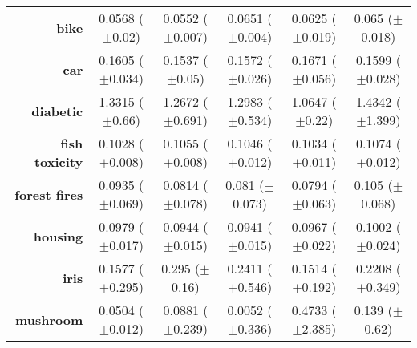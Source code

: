 \begin{table}[htb]
{\begin{tabular}{r|ccccc}
			\textbf{bike}                & \cellcolor[rgb]{ .522,  .78,  .486}0.0568 ($\pm$0.02)   & \cellcolor[rgb]{ .388,  .745,  .482}0.0552 ($\pm$0.007) & \cellcolor[rgb]{ .973,  .412,  .42}0.0651 ($\pm$0.004)  & \cellcolor[rgb]{ 1,  .922,  .518}0.0625 ($\pm$0.019)    & \cellcolor[rgb]{ .976,  .443,  .427}0.065 ($\pm$0.018)  \\
			\textbf{car}                 & \cellcolor[rgb]{ 1,  .878,  .51}0.1605 ($\pm$0.034)     & \cellcolor[rgb]{ .388,  .745,  .482}0.1537 ($\pm$0.05)  & \cellcolor[rgb]{ .733,  .843,  .502}0.1572 ($\pm$0.026) & \cellcolor[rgb]{ .973,  .412,  .42}0.1671 ($\pm$0.056)  & \cellcolor[rgb]{ 1,  .922,  .518}0.1599 ($\pm$0.028)    \\
			\textbf{diabetic}            & \cellcolor[rgb]{ .996,  .8,  .494}1.3315 ($\pm$0.66)    & \cellcolor[rgb]{ .918,  .894,  .51}1.2672 ($\pm$0.691)  & \cellcolor[rgb]{ 1,  .922,  .518}1.2983 ($\pm$0.534)    & \cellcolor[rgb]{ .388,  .745,  .482}1.0647 ($\pm$0.22)  & \cellcolor[rgb]{ .973,  .412,  .42}1.4342 ($\pm$1.399)  \\
			\textbf{fish toxicity}       & \cellcolor[rgb]{ .388,  .745,  .482}0.1028 ($\pm$0.008) & \cellcolor[rgb]{ .992,  .749,  .486}0.1055 ($\pm$0.008) & \cellcolor[rgb]{ 1,  .922,  .518}0.1046 ($\pm$0.012)    & \cellcolor[rgb]{ .604,  .808,  .494}0.1034 ($\pm$0.011) & \cellcolor[rgb]{ .973,  .412,  .42}0.1074 ($\pm$0.012)  \\
			\textbf{forest fires}        & \cellcolor[rgb]{ .988,  .663,  .471}0.0935 ($\pm$0.069) & \cellcolor[rgb]{ 1,  .922,  .518}0.0814 ($\pm$0.078)    & \cellcolor[rgb]{ .863,  .882,  .51}0.081 ($\pm$0.073)   & \cellcolor[rgb]{ .388,  .745,  .482}0.0794 ($\pm$0.063) & \cellcolor[rgb]{ .973,  .412,  .42}0.105 ($\pm$0.068)   \\
			\textbf{housing}             & \cellcolor[rgb]{ .992,  .745,  .486}0.0979 ($\pm$0.017) & \cellcolor[rgb]{ .467,  .769,  .486}0.0944 ($\pm$0.015) & \cellcolor[rgb]{ .388,  .745,  .482}0.0941 ($\pm$0.015) & \cellcolor[rgb]{ 1,  .922,  .518}0.0967 ($\pm$0.022)    & \cellcolor[rgb]{ .973,  .412,  .42}0.1002 ($\pm$0.024)  \\
			\textbf{iris}                & \cellcolor[rgb]{ .443,  .761,  .482}0.1577 ($\pm$0.295) & \cellcolor[rgb]{ .973,  .412,  .42}0.295 ($\pm$0.16)    & \cellcolor[rgb]{ .996,  .784,  .494}0.2411 ($\pm$0.546) & \cellcolor[rgb]{ .388,  .745,  .482}0.1514 ($\pm$0.192) & \cellcolor[rgb]{ 1,  .922,  .518}0.2208 ($\pm$0.349)    \\
			\textbf{mushroom}            & \cellcolor[rgb]{ .722,  .839,  .498}0.0504 ($\pm$0.012) & \cellcolor[rgb]{ 1,  .922,  .518}0.0881 ($\pm$0.239)    & \cellcolor[rgb]{ .388,  .745,  .482}0.0052 ($\pm$0.336) & \cellcolor[rgb]{ .973,  .412,  .42}0.4733 ($\pm$2.385)  & \cellcolor[rgb]{ 1,  .855,  .506}0.139 ($\pm$0.62)      \\

\end{tabular}}
\end{table}

